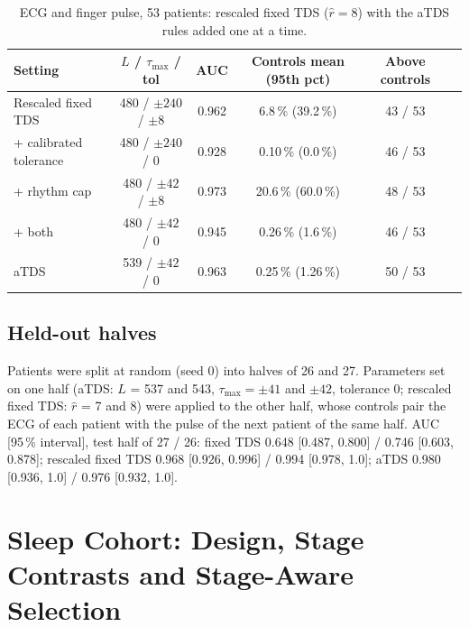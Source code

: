 \documentclass[11pt,a4paper]{article}
\begin{document}
\begin{table}[h]
\centering
\caption{ECG and finger pulse, 53 patients: rescaled fixed TDS ($\hat r = 8$) with the aTDS rules added one at a time.}
\footnotesize
\begin{tabular}{lccccc}
\toprule
Setting & $L$ / $\tau_{\max}$ / tol & AUC & Controls mean (95th pct) & Above controls & \\
\midrule
Rescaled fixed TDS & 480 / $\pm240$ / $\pm8$ & 0.962 & 6.8\,\% (39.2\,\%) & 43 / 53 & \\
+ calibrated tolerance & 480 / $\pm240$ / 0 & 0.928 & 0.10\,\% (0.0\,\%) & 46 / 53 & \\
+ rhythm cap & 480 / $\pm42$ / $\pm8$ & 0.973 & 20.6\,\% (60.0\,\%) & 48 / 53 & \\
+ both & 480 / $\pm42$ / 0 & 0.945 & 0.26\,\% (1.6\,\%) & 46 / 53 & \\
aTDS & 539 / $\pm42$ / 0 & 0.963 & 0.25\,\% (1.26\,\%) & 50 / 53 & \\
\bottomrule
\end{tabular}
\end{table}

\subsection*{Held-out halves}
Patients were split at random (seed 0) into halves of 26 and 27. Parameters set on one half (aTDS: $L$ = 537 and 543, $\tau_{\max} = \pm41$ and $\pm42$, tolerance 0; rescaled fixed TDS: $\hat r$ = 7 and 8) were applied to the other half, whose controls pair the ECG of each patient with the pulse of the next patient of the same half. AUC [95\,\% interval], test half of 27 / 26: fixed TDS 0.648 [0.487, 0.800] / 0.746 [0.603, 0.878]; rescaled fixed TDS 0.968 [0.926, 0.996] / 0.994 [0.978, 1.0]; aTDS 0.980 [0.936, 1.0] / 0.976 [0.932, 1.0].

\section{Sleep Cohort: Design, Stage Contrasts and Stage-Aware Selection}
\label{app:cohort}
\end{document}
